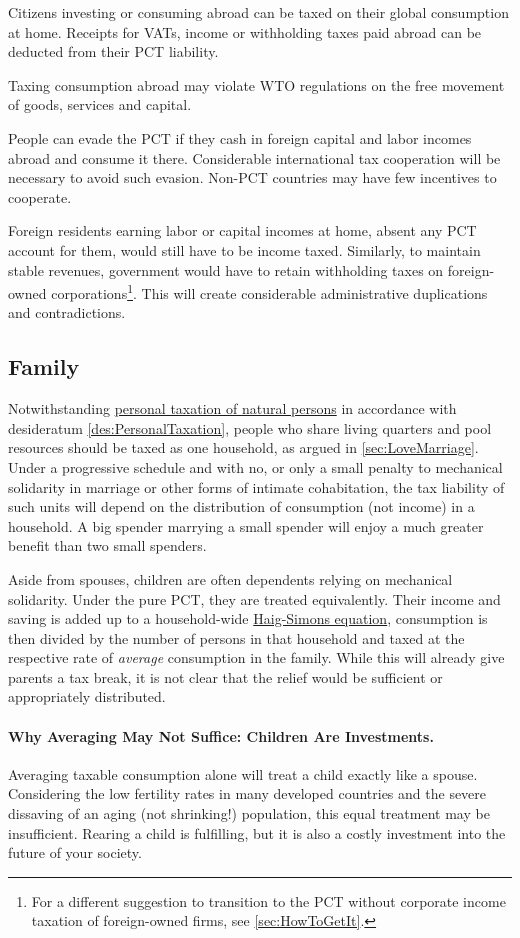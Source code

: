 Citizens investing or consuming abroad can be taxed on their global consumption at home. Receipts for VATs, income or withholding taxes paid abroad can be deducted from their PCT liability. 

Taxing consumption abroad may violate WTO regulations on the free movement of goods, services and capital. 

People can evade the PCT if they cash in foreign capital and labor incomes abroad and consume it there. Considerable international tax cooperation will be necessary to avoid such evasion. Non-PCT countries may have few incentives to cooperate.

Foreign residents earning labor or capital incomes at home, absent any PCT account for them, would still have to be income taxed. Similarly, to maintain stable revenues, government would have to retain withholding taxes on foreign-owned corporations\footnote{For a different suggestion to transition to the PCT without corporate income taxation of foreign-owned firms, see \autoref{sec:HowToGetIt}.}. This will create considerable administrative duplications and contradictions.

\subsection{Family} Notwithstanding \hyperref[des:PersonalTaxation]{personal taxation of natural persons} in accordance with desideratum \ref{des:PersonalTaxation}, people who share living quarters and pool resources should be taxed as one household, as argued in \autoref{sec:LoveMarriage}. Under a progressive schedule and with no, or only a small penalty to mechanical solidarity in marriage or other forms of intimate cohabitation, the tax liability of such units will depend on the distribution of consumption (not income) in a household. A big spender marrying a small spender will enjoy a much greater benefit than two small spenders.

Aside from spouses, children are often dependents relying on mechanical solidarity. Under the pure PCT, they are treated equivalently. Their income and saving is added up to a household-wide \hyperref[eq:HaigSimons]{Haig-Simons equation}, consumption is then divided by the number of persons in that household and taxed at the respective rate of \emph{average} consumption in the family. While this will already give parents a tax break, it is not clear that the relief would be sufficient or appropriately distributed.

\paragraph{Why Averaging May Not Suffice: Children Are Investments.} Averaging taxable consumption alone will treat a child exactly like a spouse. Considering the low fertility rates in many developed countries and the severe dissaving of an aging (not shrinking!) population, this equal treatment may be insufficient. Rearing a child is fulfilling, but it is also a costly investment into the future of your society. 

